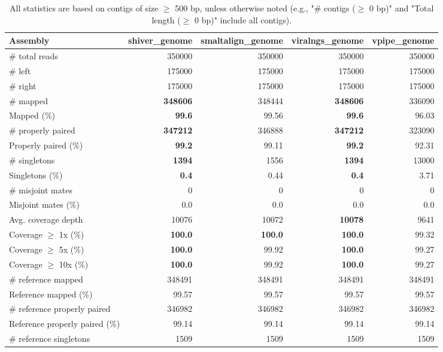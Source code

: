 \documentclass[12pt,a4paper]{article}
\begin{document}
\begin{table}[ht]
\begin{center}
\caption{All statistics are based on contigs of size $\geq$ 500 bp, unless otherwise noted (e.g., "\# contigs ($\geq$ 0 bp)" and "Total length ($\geq$ 0 bp)" include all contigs).}
\begin{tabular}{|l*{4}{|r}|}
\hline
Assembly & shiver\_genome & smaltalign\_genome & viralngs\_genome & vpipe\_genome \\ \hline
\# total reads & 350000 & 350000 & 350000 & 350000 \\ \hline
\# left & 175000 & 175000 & 175000 & 175000 \\ \hline
\# right & 175000 & 175000 & 175000 & 175000 \\ \hline
\# mapped & {\bf 348606} & 348444 & {\bf 348606} & 336090 \\ \hline
Mapped (\%) & {\bf 99.6} & 99.56 & {\bf 99.6} & 96.03 \\ \hline
\# properly paired & {\bf 347212} & 346888 & {\bf 347212} & 323090 \\ \hline
Properly paired (\%) & {\bf 99.2} & 99.11 & {\bf 99.2} & 92.31 \\ \hline
\# singletons & {\bf 1394} & 1556 & {\bf 1394} & 13000 \\ \hline
Singletons (\%) & {\bf 0.4} & 0.44 & {\bf 0.4} & 3.71 \\ \hline
\# misjoint mates & 0 & 0 & 0 & 0 \\ \hline
Misjoint mates (\%) & 0.0 & 0.0 & 0.0 & 0.0 \\ \hline
Avg. coverage depth & 10076 & 10072 & {\bf 10078} & 9641 \\ \hline
Coverage $\geq$ 1x (\%) & {\bf 100.0} & {\bf 100.0} & {\bf 100.0} & 99.32 \\ \hline
Coverage $\geq$ 5x (\%) & {\bf 100.0} & 99.92 & {\bf 100.0} & 99.27 \\ \hline
Coverage $\geq$ 10x (\%) & {\bf 100.0} & 99.92 & {\bf 100.0} & 99.27 \\ \hline
\# reference mapped & 348491 & 348491 & 348491 & 348491 \\ \hline
Reference mapped (\%) & 99.57 & 99.57 & 99.57 & 99.57 \\ \hline
\# reference properly paired & 346982 & 346982 & 346982 & 346982 \\ \hline
Reference properly paired (\%) & 99.14 & 99.14 & 99.14 & 99.14 \\ \hline
\# reference singletons & 1509 & 1509 & 1509 & 1509 \\ \hline

\end{tabular}
\end{center}
\end{table}
\end{document}
